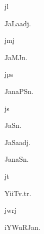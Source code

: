 \begin{multicols*}{2}
\begin{dictroot}{j}{l}
    \begin{dictentry}{JaLa}{adj.}
    \end{dictentry}
\end{dictroot}

\begin{dictroot}{j}{mj}
    \begin{dictentry}{JaMJ}{n.}
    \end{dictentry}
\end{dictroot}

\begin{dictroot}{j}{ps}
    \begin{dictentry}{JanaPS}{n.}
    \end{dictentry}
\end{dictroot}

\begin{dictroot}{j}{s}
    \begin{dictentry}{JaS}{n.}
    \end{dictentry}
    \begin{dictentry}{JaSa}{adj.}
    \end{dictentry}
    \begin{dictentry}{JanaS}{n.}
    \end{dictentry}
\end{dictroot}

\begin{dictroot}{j}{t}
    \begin{dictentry}{YiiT}{v.tr.}
    \end{dictentry}
\end{dictroot}

\begin{dictroot}{jw}{rj}
    \begin{dictentry}{iYWuRJa}{n.}
    \end{dictentry}
\end{dictroot}


\end{multicols*}
